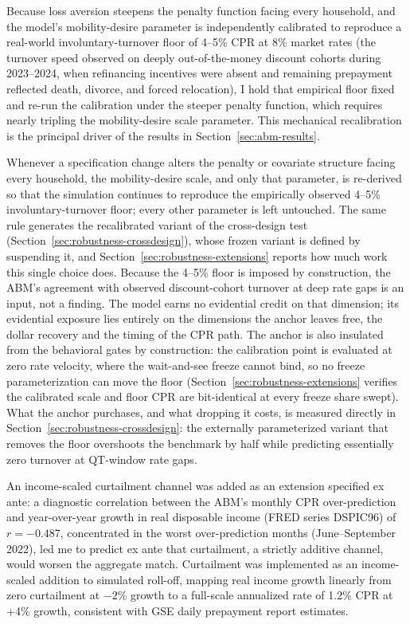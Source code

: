 \documentclass[12pt]{article}
\begin{document}
Because loss aversion steepens the penalty function facing every household, and the model's mobility-desire parameter is independently calibrated to reproduce a real-world involuntary-turnover floor of 4--5\% CPR at 8\% market rates (the turnover speed observed on deeply out-of-the-money discount cohorts during 2023--2024, when refinancing incentives were absent and remaining prepayment reflected death, divorce, and forced relocation), I hold that empirical floor fixed and re-run the calibration under the steeper penalty function, which requires nearly tripling the mobility-desire scale parameter. This mechanical recalibration is the principal driver of the results in Section~\ref{sec:abm-results}.

Whenever a specification change alters the penalty or covariate structure facing every household, the mobility-desire scale, and only that parameter, is re-derived so that the simulation continues to reproduce the empirically observed 4--5\% involuntary-turnover floor; every other parameter is left untouched. The same rule generates the recalibrated variant of the cross-design test (Section~\ref{sec:robustness-crossdesign}), whose frozen variant is defined by suspending it, and Section~\ref{sec:robustness-extensions} reports how much work this single choice does. Because the 4--5\% floor is imposed by construction, the ABM's agreement with observed discount-cohort turnover at deep rate gaps is an input, not a finding. The model earns no evidential credit on that dimension; its evidential exposure lies entirely on the dimensions the anchor leaves free, the dollar recovery and the timing of the CPR path. The anchor is also insulated from the behavioral gates by construction: the calibration point is evaluated at zero rate velocity, where the wait-and-see freeze cannot bind, so no freeze parameterization can move the floor (Section~\ref{sec:robustness-extensions} verifies the calibrated scale and floor CPR are bit-identical at every freeze share swept). What the anchor purchases, and what dropping it costs, is measured directly in Section~\ref{sec:robustness-crossdesign}: the externally parameterized variant that removes the floor overshoots the benchmark by half while predicting essentially zero turnover at QT-window rate gaps.

An income-scaled curtailment channel was added as an extension specified ex ante: a diagnostic correlation between the ABM's monthly CPR over-prediction and year-over-year growth in real disposable income (FRED series DSPIC96) of $r = -0.487$, concentrated in the worst over-prediction months (June--September 2022), led me to predict ex ante that curtailment, a strictly additive channel, would worsen the aggregate match. Curtailment was implemented as an income-scaled addition to simulated roll-off, mapping real income growth linearly from zero curtailment at $-2$\% growth to a full-scale annualized rate of 1.2\% CPR at +4\% growth, consistent with GSE daily prepayment report estimates.
\end{document}
